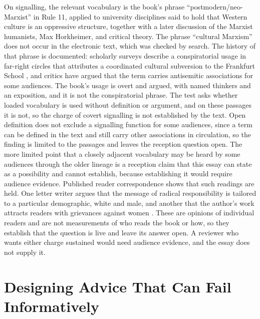 \documentclass[12pt]{article}
\begin{document}
On signalling, the relevant vocabulary is the book's phrase ``postmodern/neo-Marxist'' in Rule 11, applied to university disciplines said to hold that Western culture is an oppressive structure, together with a later discussion of the Marxist humanists, Max Horkheimer, and critical theory. The phrase ``cultural Marxism'' does not occur in the electronic text, which was checked by search. The history of that phrase is documented: scholarly surveys describe a conspiratorial usage in far-right circles that attributes a coordinated cultural subversion to the Frankfurt School \cite{jamin2018}, and critics have argued that the term carries antisemitic associations for some audiences. The book's usage is overt and argued, with named thinkers and an exposition, and it is not the conspiratorial phrase. The test asks whether loaded vocabulary is used without definition or argument, and on these passages it is not, so the charge of covert signalling is not established by the text. Open definition does not exclude a signalling function for some audiences, since a term can be defined in the text and still carry other associations in circulation, so the finding is limited to the passages and leaves the reception question open. The more limited point that a closely adjacent vocabulary may be heard by some audiences through the older lineage is a reception claim that this essay can state as a possibility and cannot establish, because establishing it would require audience evidence. Published reader correspondence shows that such readings are held. One letter writer argues that the message of radical responsibility is tailored to a particular demographic, white and male, and another that the author's work attracts readers with grievances against women \cite{atlantic2018}. These are opinions of individual readers and are not measurements of who reads the book or how, so they establish that the question is live and leave its answer open. A reviewer who wants either charge sustained would need audience evidence, and the essay does not supply it.

\section{Designing Advice That Can Fail Informatively}\label{sec:design}
\end{document}
